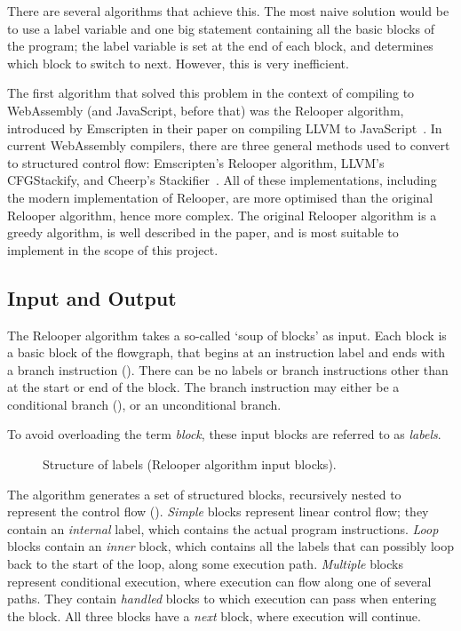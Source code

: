\documentclass[00-main.tex]{subfiles}
\begin{document}
There are several algorithms that achieve this.
The most naive solution would be to use a label variable and one big  statement containing all the basic blocks of the program; the label variable is set at the end of each block, and determines which block to switch to next. However, this is very inefficient.

The first algorithm that solved this problem in the context of compiling to WebAssembly (and JavaScript, before that) was the Relooper algorithm, introduced by Emscripten in their paper on compiling LLVM to JavaScript~.
In current WebAssembly compilers, there are three general methods used to convert to structured control flow: Emscripten's Relooper algorithm, LLVM's CFGStackify, and Cheerp's Stackifier~.
All of these implementations, including the modern implementation of Relooper, are more optimised than the original Relooper algorithm, hence more complex.
The original Relooper algorithm is a greedy algorithm, is well described in the paper, and is most suitable to implement in the scope of this project.

\subsection{Input and Output}

The Relooper algorithm takes a so-called `soup of blocks' as input.
Each block is a basic block of the flowgraph, that begins at an instruction label and ends with a branch instruction ().
There can be no labels or branch instructions other than at the start or end of the block.
The branch instruction may either be a conditional branch (), or an unconditional branch.

To avoid overloading the term \emph{block}, these input blocks are referred to as \emph{labels}.


\begin{figure}[t]
  \centering
  \caption{Structure of labels (Relooper algorithm input blocks).}
  \label{fig:relooper input label structure} %
\end{figure}

The algorithm generates a set of structured blocks, recursively nested to represent the control flow ().
\emph{Simple} blocks represent linear control flow; they contain an \emph{internal} label, which contains the actual program instructions.
\emph{Loop} blocks contain an \emph{inner} block, which contains all the labels that can possibly loop back to the start of the loop, along some execution path.
\emph{Multiple} blocks represent conditional execution, where execution can flow along one of several paths.
They contain \emph{handled} blocks to which execution can pass when entering the block.
All three blocks have a \emph{next} block, where execution will continue.
\end{document}
